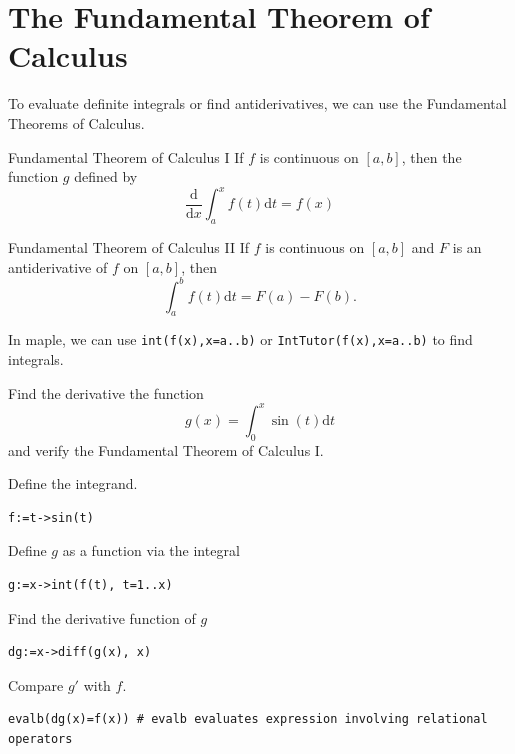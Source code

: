 \documentclass[en,11pt,simple]{elegantbook}
\let\BeginKnitrBlock\begin \let\EndKnitrBlock\end
\begin{document}
\hypertarget{the-fundamental-theorem-of-calculus}{%
\section{The Fundamental Theorem of Calculus}\label{the-fundamental-theorem-of-calculus}}

To evaluate definite integrals or find antiderivatives, we can use the Fundamental Theorems of Calculus.

\BeginKnitrBlock{theorem}{Fundamental Theorem of Calculus I}{}
\protect\hypertarget{thm:unnamed-chunk-138}{}{\label{thm:unnamed-chunk-138} {} }
If \(f\) is continuous on \([a, b]\), then the function \(g\) defined by
\[
\dfrac{\mathrm{d}}{\mathrm{d} x}\int^x_af(t)\mathrm{d} t =f(x)
\]
\EndKnitrBlock{theorem}

\BeginKnitrBlock{theorem}{Fundamental Theorem of Calculus II}{}
\protect\hypertarget{thm:unnamed-chunk-139}{}{\label{thm:unnamed-chunk-139} {} }
If \(f\) is continuous on \([a, b]\) and \(F\) is an antiderivative of \(f\) on \([a, b]\), then
\[
\int^b_af(t)\mathrm{d} t =F(a)-F(b).
\]
\EndKnitrBlock{theorem}

In maple, we can use \texttt{int(f(x),x=a..b)} or \texttt{IntTutor(f(x),x=a..b)} to find integrals.

\BeginKnitrBlock{example}{}{}
\protect\hypertarget{exm:unnamed-chunk-140}{}{\label{exm:unnamed-chunk-140} }
Find the derivative the function
\[
g(x)=\int_0^{x}\sin(t)\mathrm{d} t
\]
and verify the Fundamental Theorem of Calculus I.
\EndKnitrBlock{example}

\BeginKnitrBlock{solution}{}{}
{}
Define the integrand.

\begin{verbatim}
f:=t->sin(t)
\end{verbatim}

Define \(g\) as a function via the integral

\begin{verbatim}
g:=x->int(f(t), t=1..x)
\end{verbatim}

Find the derivative function of \(g\)

\begin{verbatim}
dg:=x->diff(g(x), x)
\end{verbatim}

Compare \(g'\) with \(f\).

\begin{verbatim}
evalb(dg(x)=f(x)) # evalb evaluates expression involving relational operators
\end{verbatim}
\EndKnitrBlock{solution}
\end{document}
